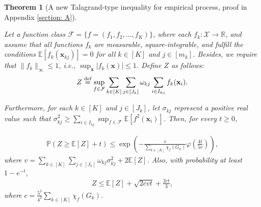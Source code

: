 \documentclass{article}
\def\sR{\mathbb{R}}
\def\vx{{\mathbf{x}}}
\def\mX{{\mathbf{X}}}
\def\eE{\mathbb{E}}
\def\pP{\mathbb{P}}
\def\defeq{\overset{\textup{def}}{=}}
\newtheorem{theorem}{Theorem}
\begin{document}
\begin{theorem}[A new Talagrand-type inequality for empirical process, proof in Appendix \ref{section: A}]
    \label{thm:talagrand_inequality}

Let a function class $\mathcal{F} = \{ f = (f_1, f_2, \ldots, f_K) \}$, where each $f_k: \mathcal{X} \rightarrow \sR$, and assume that all functions $f_k$ are measurable, square-integrable, and fulfill the conditions $\mathbb{E} [f_k(\vx_{kj})] = 0$ for all $k \in [K]$ and $j \in [m_k]$. Besides, we require that $\|f_k\|_{\infty} \leq 1$, i.e., $\sup_{\vx} |f_k(\vx)| \leq 1$. 
Define $Z$ as follows:
    \begin{align*}
        Z \defeq \sup_{f \in \mathcal{F}} \sum_{k \in [K]} \sum_{j \in [J_k]} \omega_{kj}  \sum_{i \in I_{kj}} f_k(\vx_i).
    \end{align*}

Furthermore, for each $k \in [K]$ and $j \in [J_k]$, let $\sigma_{kj}$ represent a positive real value such that $\sigma_{kj}^2 \geq \sum_{i \in I_{kj}} \sup_{f \in \mathcal{F}} \eE [f^2(\vx_i)]$. 
Then, for every $t \geq 0$,

\begin{align}
    \pP (Z \geq \eE[Z] + t) \leq \exp \left( - \frac{v}{ \sum_{k \in [K]} \chi_{f} (G_k)} \varphi \left( \frac{4t}{5v}\right) \right) ,
\end{align}
        where $v = \sum_{k \in [K]} \sum_{j \in [J_k]} \omega_{kj} \sigma_{kj}^2 + 2 \eE [Z]$. 
        Also, with probability at least $1 - e^{-t}$,
        \begin{align}
            Z \leq \eE[Z] + \sqrt{2cvt} + \frac{2ct}{3} , 
        \end{align}
        where $c = \frac{5^2}{4^2} \sum_{k \in [K]} \chi_{f} (G_k)$.
    \end{theorem}
\end{document}
